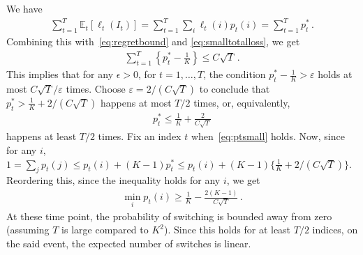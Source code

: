\documentclass{article} %
\newcommand{\EEt}[1]{\mathbb{E}_t\left[ #1 \right]}
\newcommand{\eps}{\varepsilon}
\theoremstyle{plain}
\theoremstyle{definition}
\theoremstyle{remark}
\begin{document}
We have
\begin{align*}
 \sum_{t=1}^T \EEt{\ell_t(I_t) } =  \sum_{t=1}^T \sum_i \ell_t(i) p_t(i)  = \sum_{t=1}^T p_t^* \,.
\end{align*}
Combining this with~\eqref{eq:regretbound} and \eqref{eq:smalltotalloss}, we get
\begin{align*}
\sum_{t=1}^T \left\{{p_t^*} - \frac{1}{K}\right\}  \le C \sqrt{T}\,.
\end{align*}
This implies that for any $\epsilon>0$, for $t=1,\dots,T$, 
the condition ${p_t^*} - \frac{1}{K}>\eps$ holds at most $C \sqrt{T}/\eps$ times.
Choose $\eps = 2/(C \sqrt{T})$ to conclude that
${p_t^*} > \frac{1}{K} + 2/(C \sqrt{T})$ happens at most $T/2$ times, or, equivalently,
\begin{align}
{p_t^*} \le \frac{1}{K} + \frac{2}{C \sqrt{T}}
\label{eq:ptsmall}
\end{align}
happens at least $T/2$ times.
Fix an index $t$ when~\eqref{eq:ptsmall} holds.
Now, since for any $i$,
$1 = \sum_j {p_t(j)} \le {p_t(i)} + (K-1) {p_t^*} \le {p_t(i)} + (K-1) \{\frac{1}{K} + 2/(C \sqrt{T})\}$.
Reordering this, since the inequality holds for any $i$, we get
\begin{align*}
\min_i {p_t(i)} \ge \frac{1}{K} - \frac{2(K-1)}{C \sqrt{T}}\,.
\end{align*}
At these time point, the probability of switching is bounded away from zero (assuming $T$ is large compared to $K^2$).
Since this holds for at least $T/2$ indices, on the said event, the expected number of switches is linear.

\renewcommand{\bibsection}{\subsubsection*{\refname}}


\end{document}
